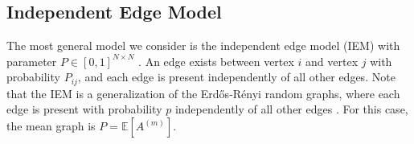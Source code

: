 \documentclass[journal,twoside,web]{ieeecolor}
\newcommand{\Ex}{\mathbb{E}}
\begin{document}



\subsection{Independent Edge Model}
The most general model we consider is the independent edge model (IEM) with parameter $P \in [0,1]^{N\times N}$ \cite{bollobas2007phase}.
An edge exists between vertex $i$ and vertex $j$ with probability $P_{ij}$, and each edge is present independently of all other edges.
Note that the IEM is a generalization of the Erd\H{o}s-R{\'e}nyi random graphs, where each edge is present with probability $p$ independently of all other edges \cite{Gilbert1959-ba,Erdos1959-ln}.
For this case, the mean graph is $P=\Ex[A^{(m)}]$.
\end{document}
